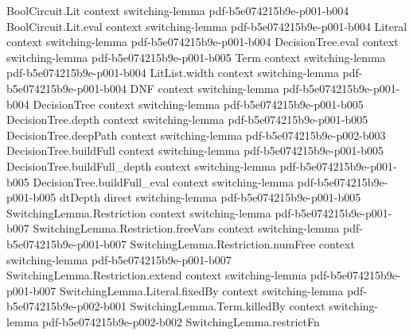 \begin{theorem}
\label{SwitchingLemma.razborovEncode_injective}
\leanok
{}
\proofstep
  {BoolCircuit.Lit}
  {context}
  {switching-lemma}
  {pdf-b5e074215b9e-p001-b004}
\proofstep
  {BoolCircuit.Lit.eval}
  {context}
  {switching-lemma}
  {pdf-b5e074215b9e-p001-b004}
\proofstep
  {Literal}
  {context}
  {switching-lemma}
  {pdf-b5e074215b9e-p001-b004}
\proofstep
  {DecisionTree.eval}
  {context}
  {switching-lemma}
  {pdf-b5e074215b9e-p001-b005}
\proofstep
  {Term}
  {context}
  {switching-lemma}
  {pdf-b5e074215b9e-p001-b004}
\proofstep
  {LitList.width}
  {context}
  {switching-lemma}
  {pdf-b5e074215b9e-p001-b004}
\proofstep
  {DNF}
  {context}
  {switching-lemma}
  {pdf-b5e074215b9e-p001-b004}
\proofstep
  {DecisionTree}
  {context}
  {switching-lemma}
  {pdf-b5e074215b9e-p001-b005}
\proofstep
  {DecisionTree.depth}
  {context}
  {switching-lemma}
  {pdf-b5e074215b9e-p001-b005}
\proofstep
  {DecisionTree.deepPath}
  {context}
  {switching-lemma}
  {pdf-b5e074215b9e-p002-b003}
\proofstep
  {DecisionTree.buildFull}
  {context}
  {switching-lemma}
  {pdf-b5e074215b9e-p001-b005}
\proofstep
  {DecisionTree.buildFull_depth}
  {context}
  {switching-lemma}
  {pdf-b5e074215b9e-p001-b005}
\proofstep
  {DecisionTree.buildFull_eval}
  {context}
  {switching-lemma}
  {pdf-b5e074215b9e-p001-b005}
\proofstep
  {dtDepth}
  {direct}
  {switching-lemma}
  {pdf-b5e074215b9e-p001-b005}
\proofstep
  {SwitchingLemma.Restriction}
  {context}
  {switching-lemma}
  {pdf-b5e074215b9e-p001-b007}
\proofstep
  {SwitchingLemma.Restriction.freeVars}
  {context}
  {switching-lemma}
  {pdf-b5e074215b9e-p001-b007}
\proofstep
  {SwitchingLemma.Restriction.numFree}
  {context}
  {switching-lemma}
  {pdf-b5e074215b9e-p001-b007}
\proofstep
  {SwitchingLemma.Restriction.extend}
  {context}
  {switching-lemma}
  {pdf-b5e074215b9e-p001-b007}
\proofstep
  {SwitchingLemma.Literal.fixedBy}
  {context}
  {switching-lemma}
  {pdf-b5e074215b9e-p002-b001}
\proofstep
  {SwitchingLemma.Term.killedBy}
  {context}
  {switching-lemma}
  {pdf-b5e074215b9e-p002-b002}
\proofstep
  {SwitchingLemma.restrictFn}

\end{theorem}
